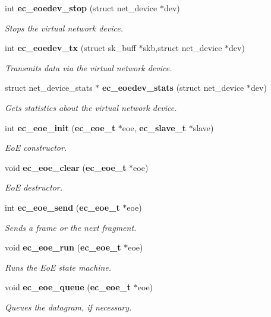 \begin{DoxyCompactItemize}
int {\bf ec\-\_\-eoedev\-\_\-stop} (struct net\-\_\-device $\ast$dev)
\begin{DoxyCompactList}\small\item\em \-Stops the virtual network device. \end{DoxyCompactList}\item 
int {\bf ec\-\_\-eoedev\-\_\-tx} (struct sk\-\_\-buff $\ast$skb,struct net\-\_\-device $\ast$dev)
\begin{DoxyCompactList}\small\item\em \-Transmits data via the virtual network device. \end{DoxyCompactList}\item 
struct net\-\_\-device\-\_\-stats $\ast$ {\bf ec\-\_\-eoedev\-\_\-stats} (struct net\-\_\-device $\ast$dev)
\begin{DoxyCompactList}\small\item\em \-Gets statistics about the virtual network device. \end{DoxyCompactList}\item 
int {\bf ec\-\_\-eoe\-\_\-init} ({\bf ec\-\_\-eoe\-\_\-t} $\ast$eoe, {\bf ec\-\_\-slave\-\_\-t} $\ast$slave)
\begin{DoxyCompactList}\small\item\em \-Eo\-E constructor. \end{DoxyCompactList}\item 
void {\bf ec\-\_\-eoe\-\_\-clear} ({\bf ec\-\_\-eoe\-\_\-t} $\ast$eoe)
\begin{DoxyCompactList}\small\item\em \-Eo\-E destructor. \end{DoxyCompactList}\item 
int {\bf ec\-\_\-eoe\-\_\-send} ({\bf ec\-\_\-eoe\-\_\-t} $\ast$eoe)
\begin{DoxyCompactList}\small\item\em \-Sends a frame or the next fragment. \end{DoxyCompactList}\item 
void {\bf ec\-\_\-eoe\-\_\-run} ({\bf ec\-\_\-eoe\-\_\-t} $\ast$eoe)
\begin{DoxyCompactList}\small\item\em \-Runs the \-Eo\-E state machine. \end{DoxyCompactList}\item 
void {\bf ec\-\_\-eoe\-\_\-queue} ({\bf ec\-\_\-eoe\-\_\-t} $\ast$eoe)
\begin{DoxyCompactList}\small\item\em \-Queues the datagram, if necessary. \end{DoxyCompactList}\item 

\end{DoxyCompactItemize}
